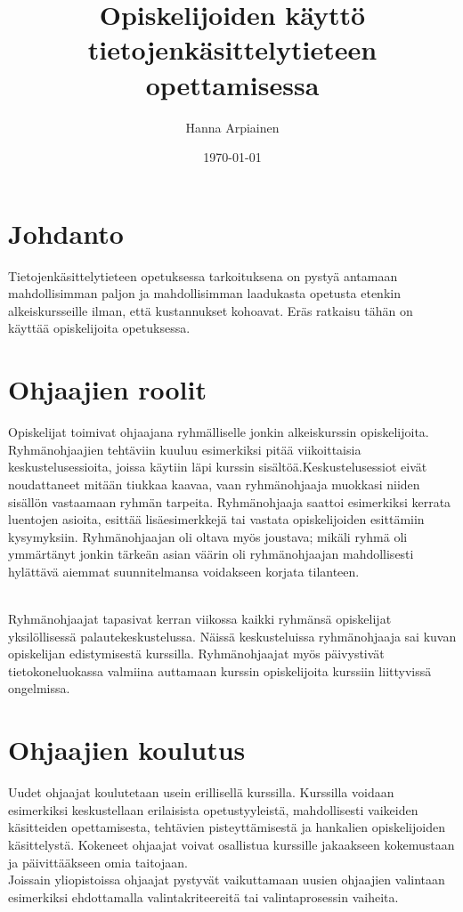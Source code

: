 \documentclass[finnish]{tktltiki2}
\title{﻿Opiskelijoiden käyttö tietojenkäsittelytieteen opettamisessa}
\author{Hanna Arpiainen}
\date{\today}
\theoremstyle{definition}
\theoremstyle{remark}
\begin{document}
\maketitle
\makeabstract

\tableofcontents
\newpage



\section{Johdanto}
Tietojenkäsittelytieteen opetuksessa tarkoituksena on pystyä antamaan mahdollisimman paljon ja mahdollisimman laadukasta opetusta etenkin alkeiskursseille ilman, että kustannukset kohoavat. Eräs ratkaisu tähän on käyttää opiskelijoita opetuksessa.



\section{Ohjaajien roolit}
Opiskelijat toimivat ohjaajana ryhmälliselle jonkin alkeiskurssin opiskelijoita. Ryhmänohjaajien tehtäviin kuuluu esimerkiksi pitää viikoittaisia keskustelusessioita, joissa käytiin läpi kurssin sisältöä.Keskustelusessiot eivät noudattaneet mitään tiukkaa kaavaa, vaan ryhmänohjaaja muokkasi niiden sisällön vastaamaan ryhmän tarpeita. Ryhmänohjaaja saattoi esimerkiksi kerrata luentojen asioita, esittää lisäesimerkkejä tai vastata opiskelijoiden esittämiin kysymyksiin. Ryhmänohjaajan oli oltava myös joustava; mikäli ryhmä oli ymmärtänyt jonkin tärkeän asian väärin oli ryhmänohjaajan mahdollisesti hylättävä aiemmat suunnitelmansa voidakseen korjata tilanteen.

\\

Ryhmänohjaajat tapasivat kerran viikossa kaikki ryhmänsä opiskelijat yksilöllisessä palautekeskustelussa. Näissä keskusteluissa ryhmänohjaaja sai kuvan opiskelijan edistymisestä kurssilla. Ryhmänohjaajat myös päivystivät tietokoneluokassa valmiina auttamaan kurssin opiskelijoita kurssiin liittyvissä ongelmissa.



\section{Ohjaajien koulutus}
Uudet ohjaajat koulutetaan usein erillisellä kurssilla. Kurssilla voidaan esimerkiksi keskustellaan erilaisista opetustyyleistä, mahdollisesti vaikeiden käsitteiden opettamisesta, tehtävien pisteyttämisestä ja hankalien opiskelijoiden käsittelystä. Kokeneet ohjaajat voivat osallistua kurssille jakaakseen kokemustaan ja päivittääkseen omia taitojaan.
\\
Joissain yliopistoissa ohjaajat pystyvät vaikuttamaan uusien ohjaajien valintaan esimerkiksi ehdottamalla valintakriteereitä tai valintaprosessin vaiheita.
\end{document}

